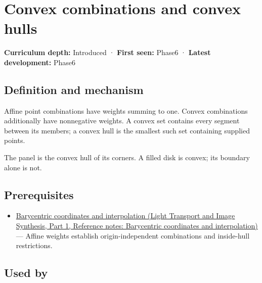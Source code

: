 \hypertarget{appendix-0026ec42c9d5}{}\label{referencestart:appendix-0026ec42c9d5}
\section{Convex combinations and convex hulls}\label{appendix-0026ec42c9d5-convex-combinations-and-convex-hulls}

\hypertarget{appendix-0026ec42c9d5-convex-combinations-and-convex-hulls}{}

\textbf{Curriculum depth:} Introduced · \textbf{First seen:} Phase6 · \textbf{Latest development:} Phase6

\begin{allmightroledefinition}

\subsection{Definition and mechanism}\label{appendix-0026ec42c9d5-definition-and-mechanism}

\hypertarget{appendix-0026ec42c9d5-definition-and-mechanism}{}

Affine point combinations have weights summing to one. Convex combinations additionally have nonnegative weights. A convex set contains every segment between its members; a convex hull is the smallest such set containing supplied points.

\end{allmightroledefinition}

The panel is the convex hull of its corners. A filled disk is convex; its boundary alone is not.

\subsection{Prerequisites}\label{appendix-0026ec42c9d5-prerequisites}

\hypertarget{appendix-0026ec42c9d5-prerequisites}{}

\begin{itemize}
\tightlist
\item
  \href{../04-Light-Transport-and-Image-Synthesis-P01/main.pdf\#appendix-02b9d9a81dca}{Barycentric coordinates and interpolation (Light Transport and Image Synthesis, Part 1, Reference notes: Barycentric coordinates and interpolation)} --- Affine weights establish origin-independent combinations and inside-hull restrictions.
\end{itemize}

\subsection{Used by}\label{appendix-0026ec42c9d5-used-by}

